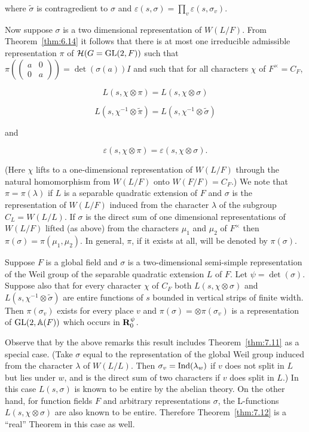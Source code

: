 where $\tilde{\sigma}$ is contragredient to $\sigma$ and $\varepsilon(s,\sigma) = \prod_v \varepsilon(s,\sigma_v)$.

Now suppose $\sigma$ is a two dimensional representation of $W(L/F)$. From Theorem~\ref{thm:6.14} it follows that there is at most one irreducible admissible representation $\pi$ of $\mathcal{H}(G = \operatorname{GL}(2,F))$ such that $\pi\left(\begin{pmatrix} a & 0 \\ 0 & a \end{pmatrix}\right) = \det(\sigma(a))I$ and such that for all characters $\chi$ of $F^{\times} = C_F$,

\[
L(s,\chi \otimes \pi) = L(s,\chi \otimes \sigma)
\]

\[
L(s,\chi^{-1} \otimes \tilde{\pi}) = L(s,\chi^{-1} \otimes \tilde{\sigma})
\]

and

\[
\varepsilon(s,\chi \otimes \pi) = \varepsilon(s,\chi \otimes \sigma).
\]

(Here $\chi$ lifts to a one-dimensional representation of $W(L/F)$ through the natural homomorphism from $W(L/F)$ onto $W(F/F) = C_F$.) We note that $\pi = \pi(\lambda)$ if $L$ is a separable quadratic extension of $F$ and $\sigma$ is the representation of $W(L/F)$ induced from the character $\lambda$ of the subgroup $C_L = W(L/L)$. If $\sigma$ is the direct sum of one dimensional representations of $W(L/F)$ lifted (as above) from the characters $\mu_1$ and $\mu_2$ of $F^{\times}$ then $\pi(\sigma) = \pi(\mu_1, \mu_2)$. In general, $\pi$, if it exists at all, will be denoted by $\pi(\sigma)$.

\begin{theorem}\label{thm:7.13}

Suppose $F$ is a global field and $\sigma$ is a two-dimensional semi-simple representation of the Weil group of the separable quadratic extension $L$ of $F$. Let $\psi = \det(\sigma)$. Suppose also that for every character $\chi$ of $C_F$ both $L(s,\chi \otimes \sigma)$ and $L(s,\chi^{-1} \otimes \tilde{\sigma})$ are entire functions of $s$ bounded in vertical strips of finite width. Then $\pi(\sigma_v)$ exists for every place $v$ and $\pi(\sigma) = \otimes \pi(\sigma_v)$ is a representation of $\operatorname{GL}(2,\mathbb{A}(F))$ which occurs in $\mathbf{R}_0^\psi$.

\end{theorem}

Observe that by the above remarks this result includes Theorem~\ref{thm:7.11} as a special case. (Take $\sigma$ equal to the representation of the global Weil group induced from the character $\lambda$ of $W(L/L)$. Then $\sigma_v = \operatorname{Ind}(\lambda_w)$ if $v$ does not split in $L$ but lies under $w$, and is the direct sum of two characters if $v$ does split in $L$.) In this case $L(s,\sigma)$ is known to be entire by the abelian theory. On the other hand, for function fields $F$ and arbitrary representations $\sigma$, the L-functions $L(s,\chi \otimes \sigma)$ are also known to be entire. Therefore Theorem~\ref{thm:7.12} is a ``real'' Theorem in this case as well.

